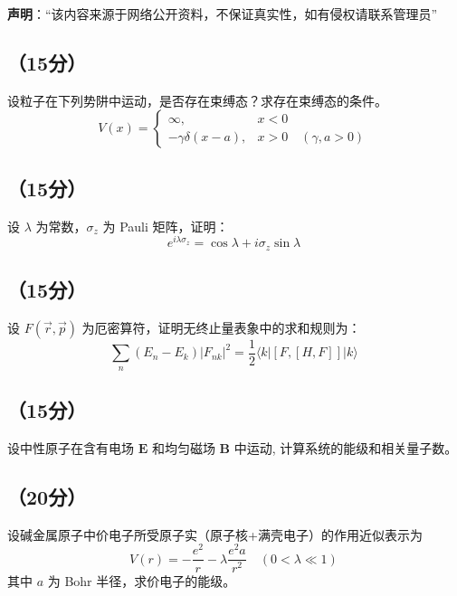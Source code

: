 
\textbf{声明}：“该内容来源于网络公开资料，不保证真实性，如有侵权请联系管理员”

\subsection{（15分）}
设粒子在下列势阱中运动，是否存在束缚态？求存在束缚态的条件。
\[
V(x) =
\begin{cases}
\infty, & x < 0 \\
-\gamma \delta(x - a), & x > 0 \quad (\gamma, a > 0)
\end{cases}~
\]

\subsection{（15分）}
设 $\lambda$ 为常数，$\sigma_z$ 为 Pauli 矩阵，证明：
    \[
    e^{i \lambda \sigma_z} = \cos \lambda + i \sigma_z \sin \lambda~
    \]

\subsection{（15分）}
设 $F(\vec{r},\vec{p})$ 为厄密算符，证明无终止量表象中的求和规则为：
    \[
    \sum_n (E_n - E_k) |F_{nk}|^2 = \frac{1}{2} \langle k | [F, [H, F]] | k \rangle~
    \]

\subsection{（15分）}
设中性原子在含有电场 $\mathbf{E}$ 和均匀磁场 $\mathbf{B}$ 中运动, 计算系统的能级和相关量子数。

\subsection{（20分）}
设碱金属原子中价电子所受原子实（原子核+满壳电子）的作用近似表示为
\[
V(r) = -\frac{e^2}{r} - \lambda \frac{e^2 a}{r^2} \quad (0 < \lambda \ll 1)~
\]
其中 $a$ 为 Bohr 半径，求价电子的能级。
